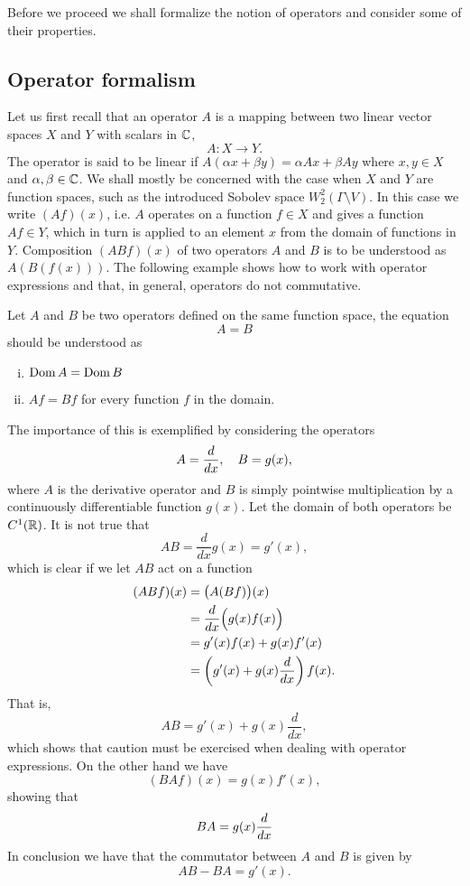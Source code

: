 Before we proceed we shall formalize the notion of operators and consider some of their properties.


\subsection{Operator formalism}

Let us first recall that an operator $A$ is a mapping between two linear vector spaces $X$ and $Y$ with scalars in $\mathbb{C}$,
\[ A : X \to Y. \]
The operator is said to be linear if $A(\alpha x + \beta y) = \alpha A x + \beta A y$ where $x,y \in X$ and $\alpha, \beta \in \mathbb{C}$.
We shall mostly be concerned with the case when $X$ and $Y$ are function spaces, such as the introduced Sobolev space $W_2^2(\Gamma\setminus V)$. In this case we write $(Af)(x)$, i.e. $A$ operates on a function $f \in X$ and gives a function $Af \in Y$, which in turn is applied to an element $x$ from the domain of functions in $Y$.
Composition $(ABf)(x)$ of two operators $A$ and $B$ is to be understood as $A(B(f(x)))$.
The following example shows how to work with operator expressions and that, in general, operators do not commutative.

\begin{example}
  Let $A$ and $B$ be two operators defined on the same function space, the equation
  \[ A = B \]
  should be understood as
  \begin{enumerate}[i)]
    \item $\operatorname{Dom} A = \operatorname{Dom} B$
    \item $Af = Bf$ for every function $f$ in the domain.
  \end{enumerate}
  The importance of this is exemplified by considering the operators
  \[ A = \frac{d}{dx}, \quad B = g(x), \]
  where $A$ is the derivative operator and $B$ is simply pointwise multiplication by a continuously differentiable function $g(x)$. Let the domain of both operators be $C^1(\mathbb{R})$. It is not true that
  \begin{equation*}
    AB = \frac{d}{dx}g(x) = g'(x),
  \end{equation*}
  which is clear if we let $AB$ act on a function
  \begin{align*}
    (ABf)(x) &= \big(A(Bf)\big)(x) \\
    &= \frac{d}{dx}\Big(g(x)f(x)\Big) \\
    &= g'(x)f(x)+g(x)f'(x) \\
    &= \left(g'(x)+g(x)\frac{d}{dx}\right)f(x).
  \end{align*}
  That is,
  \[ AB = g'(x)+g(x)\frac{d}{dx}, \]
  which shows that caution must be exercised when dealing with operator expressions.
  On the other hand we have
  \[ (BAf)(x) = g(x)f'(x), \]
  showing that
  \[
    BA = g(x)\frac{d}{dx}
  \]
  In conclusion we have that the commutator between $A$ and $B$ is given by
  \[
    AB-BA = g'(x).
  \]
\end{example}

